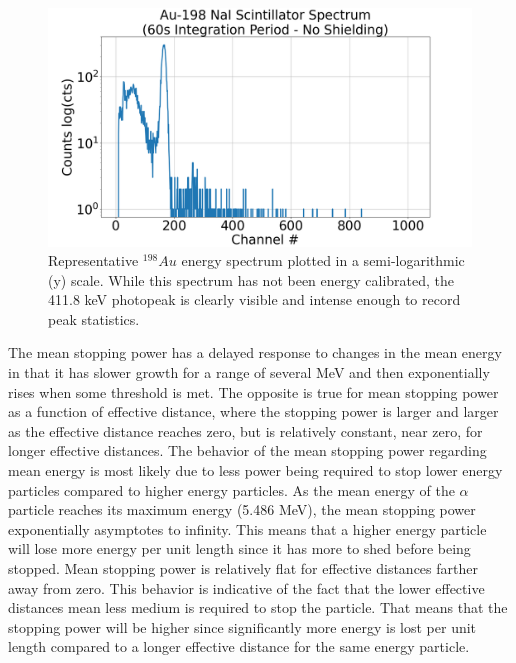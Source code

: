 \begin{figure}
\centering
\includegraphics[width=\textwidth]{au198_spectrum.png}
\caption{Representative ${}^{198}Au$ energy spectrum plotted in a semi-logarithmic (y) scale. While this spectrum has not been energy calibrated, the 411.8 keV photopeak is clearly visible and intense enough to record peak statistics.}
\label{fig:au198-spectrum}
\end{figure}

The mean stopping power has a delayed response to changes in the mean energy in that it has slower growth for a range of several MeV and then exponentially rises when some threshold is met. The opposite is true for mean stopping power as a function of effective distance, where the stopping power is larger and larger as the effective distance reaches zero, but is relatively constant, near zero, for longer effective distances. The behavior of the mean stopping power regarding mean energy is most likely due to less power being required to stop lower energy particles compared to higher energy particles. As the mean energy of the $\alpha$ particle reaches its maximum energy (5.486 MeV), the mean stopping power exponentially asymptotes to infinity. This means that a higher energy particle will lose more energy per unit length since it has more to shed before being stopped. Mean stopping power is relatively flat for effective distances farther away from zero. This behavior is indicative of the fact that the lower effective distances mean less medium is required to stop the particle. That means that the stopping power will be higher since significantly more energy is lost per unit length compared to a longer effective distance for the same energy particle.


